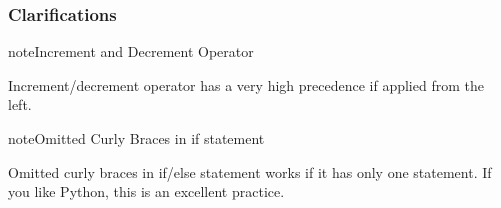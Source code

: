 \documentclass[letterpaper,12pt,english]{sphinxmanual}
\begin{document}
\subsubsection{Clarifications}
\label{\detokenize{cpp/basics:clarifications}}
\begin{sphinxadmonition}{note}{Increment and Decrement Operator}

Increment/decrement operator has a very high precedence if applied from the left.

\begin{sphinxVerbatim}[commandchars=\\\{\}]
  
  

  
  
\end{sphinxVerbatim}
\end{sphinxadmonition}

\begin{sphinxadmonition}{note}{Omitted Curly Braces in if statement}

Omitted curly braces in if/else statement works if it has only one statement. If you like Python, this is an excellent practice.

\begin{sphinxVerbatim}[commandchars=\\\{\}]
 
  

  
       

      
        
        

    
\end{sphinxVerbatim}
\end{sphinxadmonition}
\end{document}
